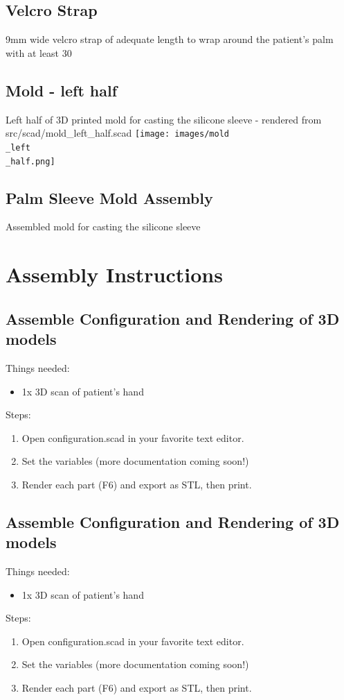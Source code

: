 \documentclass[11pt]{article}
\begin{document}
\hypertarget{thing_velcro\_strap}{\subsection{Velcro Strap}}
9mm wide velcro strap of adequate length to wrap around the patient's palm with at least 30%

\hypertarget{thing_mold\_left\_half}{\subsection{Mold - left half}}
Left half of 3D printed mold for casting the silicone sleeve - rendered from src/scad/mold_left_half.scad
\texttt{[image: images/mold\\\_left\\\_half.png]}

\hypertarget{thing_mold\_assembly}{\subsection{Palm Sleeve Mold Assembly}}
Assembled mold for casting the silicone sleeve

\newpage

\section{Assembly Instructions}

\subsection{Assemble Configuration and Rendering of 3D models}
Things needed:
\begin{itemize}
\item 1x 3D scan of patient's hand
\end{itemize}
Steps:
\begin{enumerate}
\item Open configuration.scad in your favorite text editor.
\item Set the variables (more documentation coming soon!)
\item Render each part (F6) and export as STL, then print.
\end{enumerate}

\subsection{Assemble Configuration and Rendering of 3D models}
Things needed:
\begin{itemize}
\item 1x 3D scan of patient's hand
\end{itemize}
Steps:
\begin{enumerate}
\item Open configuration.scad in your favorite text editor.
\item Set the variables (more documentation coming soon!)
\item Render each part (F6) and export as STL, then print.
\end{enumerate}
\end{document}
